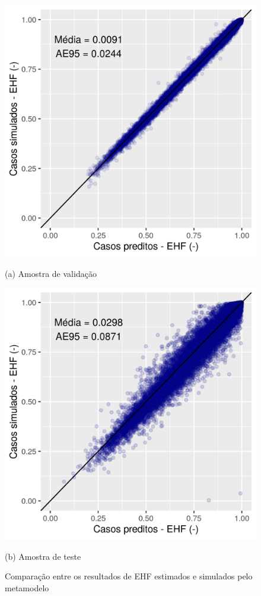 \documentclass[brazil,hardcopy,openany]{ufscthesis} %
\begin{document}
\begin{figure}[h]
	\caption{Comparação entre os resultados de EHF estimados e simulados pelo metamodelo}
	\begin{minipage}{.5\textwidth}
		\centering
		\includegraphics[width=1\linewidth]{img/ann_validation.png}
		\begin{center}
			\small{(a) Amostra de validação}
		\end{center}
	\end{minipage}%
	\begin{minipage}{.5\textwidth}
		\centering
		\includegraphics[width=1\linewidth]{img/ann_test.png}
		\begin{center}
			\small{(b) Amostra de teste}
		\end{center}
	\end{minipage}
	\label{fig:ann_validation}
\end{figure}
\end{document}
